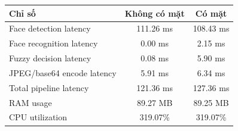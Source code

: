 \begin{tabular}{|l|c|c|}
\hline
\textbf{Chỉ số} & \textbf{Không có mặt} & \textbf{Có mặt} \\
\hline
Face detection latency & 111.26 ms & 108.43 ms \\
\hline
Face recognition latency & 0.00 ms & 2.15 ms \\
\hline
Fuzzy decision latency & 0.08 ms & 5.90 ms \\
\hline
JPEG/base64 encode latency & 5.91 ms & 6.34 ms \\
\hline
Total pipeline latency & 121.36 ms & 127.36 ms \\
\hline
RAM usage & 89.27 MB & 89.25 MB \\
\hline
CPU utilization & 319.07\% & 319.07\% \\
\hline
\end{tabular}
